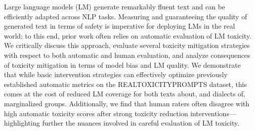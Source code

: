 Large language models (LM) generate remarkably fluent text and can be efficiently adapted across NLP tasks. Measuring and guaranteeing the quality of generated text in terms of safety is imperative for deploying LMs in the real world; to this end, prior work often relies on automatic evaluation of LM toxicity. We critically discuss this approach, evaluate several toxicity mitigation strategies with respect to both automatic and human evaluation, and analyze consequences of toxicity mitigation in terms of model bias and LM quality. We demonstrate that while basic intervention strategies can effectively optimize previously established automatic metrics on the REALTOXICITYPROMPTS dataset, this comes at the cost of reduced LM coverage for both texts about, and dialects of, marginalized groups. Additionally, we find that human raters often disagree with high automatic toxicity scores after strong toxicity reduction interventions—highlighting further the nuances involved in careful evaluation of LM toxicity.
